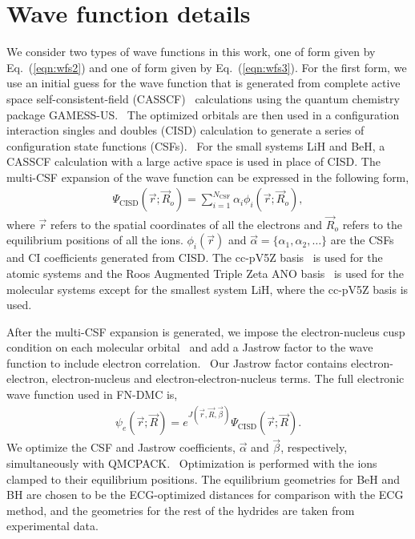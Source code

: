 \documentclass[aip,jcp,numerical,reprint]{revtex4-1}
\begin{document}
\section{ Wave function details}
We consider two types of wave functions in this work, one of form given by Eq.~(\ref{eqn:wfs2}) and one of form given by  Eq.~(\ref{eqn:wfs3}).  For the first form, we use an initial guess for the wave function that is generated from complete active space self-consistent-field (CASSCF)~\cite{Chaban_MCSCF,Szabo} calculations using the quantum chemistry package GAMESS-US.~\cite{GAMESS} The optimized orbitals are then used in a configuration interaction singles and doubles (CISD) calculation to generate a series of configuration state functions (CSFs).~\cite{Pauncz_CSF} For the small systems LiH and BeH, a CASSCF calculation with a large active space is used in place of CISD. The multi-CSF expansion of the wave function can be expressed in the following form,
\begin{align}
\Psi_{\text{CISD}}(\vec{r};\vec{R}_o)=\sum\limits_{i=1}^{N_{\text{CSF}}}\alpha_i\phi_i(\vec{r};\vec{R}_o), \label{eq:psi_gms}
\end{align}
where $\vec{r}$ refers to the spatial coordinates of all the electrons and $\vec{R}_o$ refers to the equilibrium positions of all the ions. $\phi_i(\vec{r})$ and $\vec{\alpha}=\{\alpha_1,\alpha_2,\dots\}$ are the CSFs and CI coefficients generated from CISD. The cc-pV5Z basis~\cite{dunning} is used for the atomic systems and the Roos Augmented Triple Zeta ANO basis~\cite{roos} is used for the molecular systems except for the smallest system LiH, where the cc-pV5Z basis is used.

After the multi-CSF expansion is generated, we impose the electron-nucleus cusp condition on each molecular orbital~\cite{cusp} and add a Jastrow factor to the wave function to include electron correlation.~\cite{Kato} Our Jastrow factor contains electron-electron, electron-nucleus and electron-electron-nucleus terms. The full electronic wave function used in FN-DMC is,
\begin{align}
\psi_e(\vec{r};\vec{R})=e^{J(\vec{r},\vec{R},\vec{\beta})}\Psi_{\text{CISD}}(\vec{r};\vec{R})\label{eq:psie}.
\end{align}
We optimize the CSF and Jastrow coefficients, $\vec{\alpha}$ and $\vec{\beta}$, respectively, simultaneously with QMCPACK.~\cite{QMCPACK_Kim,QMCPACK_Esler} Optimization is performed with the ions clamped to their equilibrium positions. The equilibrium geometries for BeH and BH are chosen to be the ECG-optimized distances for comparison with the ECG  method, and the geometries for the rest of the hydrides are taken from experimental data.~\cite{CCCBDB}
\end{document}
